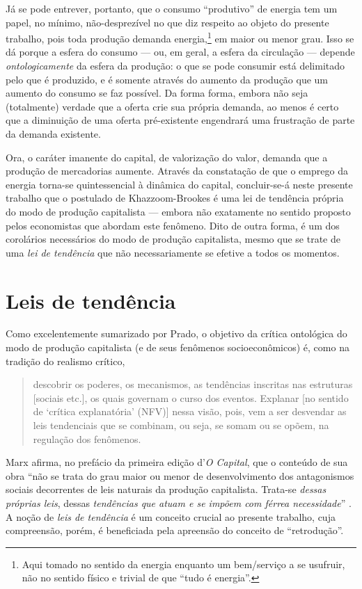 Já se pode entrever, portanto, que o consumo ``produtivo'' de energia tem um papel, no mínimo, não-desprezível no que diz respeito ao objeto do presente trabalho, pois toda produção demanda energia,\footnote{Aqui tomado no sentido da energia enquanto um bem/serviço a se usufruir, não no sentido físico e trivial de que ``tudo é energia''.} em maior ou menor grau. Isso se dá porque a esfera do consumo --- ou, em geral, a esfera da circulação --- depende \emph{ontologicamente} da esfera da produção: o que se pode consumir está delimitado pelo que é produzido, e é somente através do aumento da produção que um aumento do consumo se faz possível. Da forma forma, embora não seja (totalmente) verdade que a oferta crie sua própria demanda, ao menos é certo que a diminuição de uma oferta pré-existente engendrará uma frustração de parte da demanda existente.

Ora, o caráter imanente do capital, de valorização do valor, demanda que a produção de mercadorias aumente. Através da constatação de que o emprego da energia torna-se quintessencial à dinâmica do capital, concluir-se-á neste presente trabalho que o postulado de Khazzoom-Brookes é uma lei de tendência própria do modo de produção capitalista --- embora não exatamente no sentido proposto pelos economistas que abordam este fenômeno. Dito de outra forma, é um dos corolários necessários do modo de produção capitalista, mesmo que se trate de uma \emph{lei de tendência} que não necessariamente se efetive a todos os momentos.

\hypertarget{leis-de-tenduxeancia}{%
\section{Leis de tendência}\label{leis-de-tenduxeancia}}

Como excelentemente sumarizado por Prado, o objetivo da crítica ontológica do modo de produção capitalista (e de seus fenômenos socioeconômicos) é, como na tradição do realismo crítico,

\begin{quote}
descobrir os poderes, os mecanismos, as tendências inscritas nas estruturas {[}sociais etc.{]}, os quais governam o curso dos eventos. Explanar {[}no sentido de `crítica explanatória' (NFV){]} nessa visão, pois, vem a ser desvendar as leis tendenciais que se combinam, ou seja, se somam ou se opõem, na regulação dos fenômenos. \parencite[p. 40]{Prado2009}
\end{quote}

Marx afirma, no prefácio da primeira edição d'\emph{O Capital}, que o conteúdo de sua obra ``não se trata do grau maior ou menor de desenvolvimento dos antagonismos sociais decorrentes de leis naturais da produção capitalista. Trata-se \emph{dessas próprias leis}, dessas \emph{tendências que atuam e se impõem com férrea necessidade}'' \parencite[p. 78, grifo meu]{Marx2017}. A noção de \emph{leis de tendência} é um conceito crucial ao presente trabalho, cuja compreensão, porém, é beneficiada pela apreensão do conceito de ``retrodução''.


